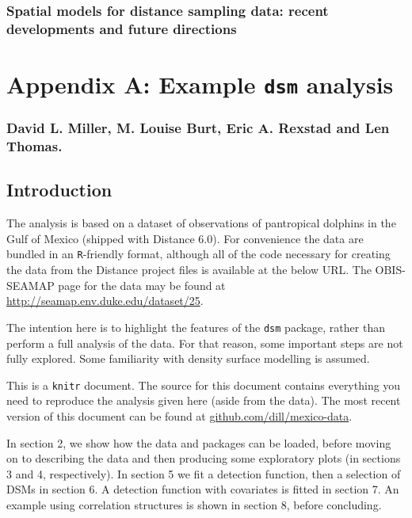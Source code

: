 \documentclass[]{article}
\author{}
\date{}
\begin{document}
\subsubsection{Spatial models for distance sampling data: recent
developments and future
directions}\label{spatial-models-for-distance-sampling-data-recent-developments-and-future-directions}

\section{Appendix A: Example \texttt{dsm}
analysis}\label{appendix-a-example-dsm-analysis}

\subsubsection{David L. Miller, M. Louise Burt, Eric A. Rexstad and Len
Thomas.}\label{david-l.-miller-m.-louise-burt-eric-a.-rexstad-and-len-thomas.}

\subsection{Introduction}\label{introduction}

The analysis is based on a dataset of observations of pantropical
dolphins in the Gulf of Mexico (shipped with Distance 6.0). For
convenience the data are bundled in an \texttt{R}-friendly format,
although all of the code necessary for creating the data from the
Distance project files is available at the below URL. The OBIS-SEAMAP
page for the data may be found at
\url{http://seamap.env.duke.edu/dataset/25}.

The intention here is to highlight the features of the \texttt{dsm}
package, rather than perform a full analysis of the data. For that
reason, some important steps are not fully explored. Some familiarity
with density surface modelling is assumed.

This is a \texttt{knitr} document. The source for this document contains
everything you need to reproduce the analysis given here (aside from the
data). The most recent version of this document can be found at
\href{http://github.com/dill/mexico-data}{github.com/dill/mexico-data}.

In section 2, we show how the data and packages can be loaded, before
moving on to describing the data and then producing some exploratory
plots (in sections 3 and 4, respectively). In section 5 we fit a
detection function, then a selection of DSMs in section 6. A detection
function with covariates is fitted in section 7. An example using
correlation structures is shown in section 8, before concluding.
\end{document}
